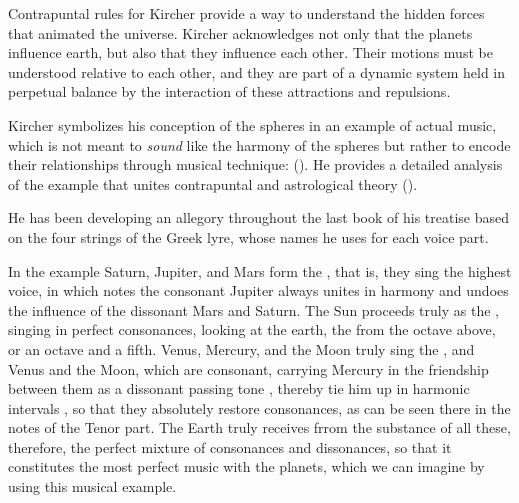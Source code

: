 Contrapuntal rules for Kircher provide a way to understand the hidden forces
that animated the universe.%
    \Autocites
    {Gouk:Harmonics}
    {Gouk:MusicScienceMagic}
Kircher acknowledges not only that the planets influence earth, but also
that they influence each other.
Their motions must be understood relative to each other, and they are part of a
dynamic system held in perpetual balance by the interaction of these
attractions and repulsions.

Kircher symbolizes his conception of the spheres in an example of actual music,
which is not meant to \emph{sound} like the harmony of the spheres but rather to
encode their relationships through musical technique:
 ().%
    \Autocite[, 383]{Kircher:Musurgia}
He provides a detailed analysis of the example that unites contrapuntal and
astrological theory ().%
\begin{Footnote}
    He has been developing an allegory throughout the last book of his treatise
    based on the four strings of the Greek lyre, whose names he uses for each
    voice part.
\end{Footnote}
\begin{quoting}
	In the example Saturn, Jupiter, and Mars form the , that
	is, they sing the highest voice, in which notes the consonant Jupiter
	always unites in harmony  and undoes the influence of
	 the dissonant Mars and Saturn.
	The Sun proceeds truly as the  , singing in
	perfect consonances, looking at the earth, the 
	 from the octave above, or an octave and a fifth.
	Venus, Mercury, and the Moon truly sing the 
	, and Venus and the Moon, which are consonant, carrying
	Mercury in the friendship between them as a dissonant passing tone
	, thereby tie him up in harmonic
	intervals , so that they absolutely restore
	consonances, as can be seen there in the notes of the Tenor part.
	The Earth truly receives frrom the substance of all these, therefore,
	the perfect mixture of consonances and dissonances, so that it
        constitutes the most perfect music with the planets, which we can
        imagine by using this musical example.%
            \Autocite[, 383--384]{Kircher:Musurgia}
\end{quoting}

